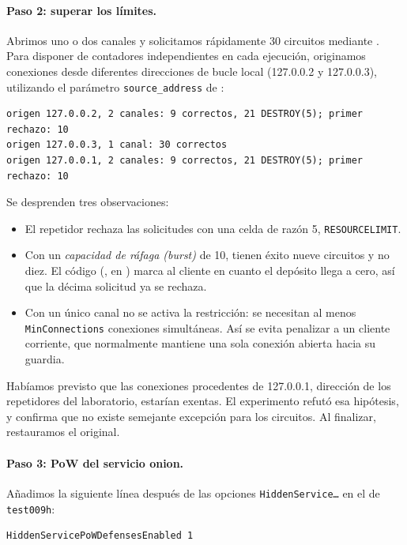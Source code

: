 \paragraph{Paso 2: superar los límites.} Abrimos uno o dos canales y solicitamos rápidamente 30 circuitos mediante . Para disponer de contadores independientes en cada ejecución, originamos conexiones desde diferentes direcciones de bucle local (127.0.0.2 y 127.0.0.3), utilizando el parámetro \texttt{source\_address} de :
\begin{lstlisting}[numbers=none]
origen 127.0.0.2, 2 canales: 9 correctos, 21 DESTROY(5); primer rechazo: 10
origen 127.0.0.3, 1 canal: 30 correctos
origen 127.0.0.1, 2 canales: 9 correctos, 21 DESTROY(5); primer rechazo: 10
\end{lstlisting}

Se desprenden tres observaciones:
\begin{itemize}
  \item El repetidor rechaza las solicitudes con una celda  de razón 5, \texttt{RESOURCELIMIT}.
  \item Con un \emph{capacidad de ráfaga (burst)} de 10, tienen éxito nueve circuitos y no diez. El código (, en ) marca al cliente en cuanto el depósito llega a cero, así que la décima solicitud ya se rechaza.
  \item Con un único canal no se activa la restricción: se necesitan al menos \texttt{MinConnections} conexiones simultáneas. Así se evita penalizar a un cliente corriente, que normalmente mantiene una sola conexión abierta hacia su guardia.
\end{itemize}

Habíamos previsto que las conexiones procedentes de 127.0.0.1, dirección de los repetidores del laboratorio, estarían exentas. El experimento refutó esa hipótesis, y  confirma que no existe semejante excepción para los circuitos. Al finalizar, restauramos el  original.

\paragraph{Paso 3: PoW del servicio onion.} Añadimos la siguiente línea después de las opciones \texttt{HiddenService\ldots} en el  de \texttt{test009h}:
\begin{lstlisting}[language=torrc,numbers=none]
HiddenServicePoWDefensesEnabled 1
\end{lstlisting}

